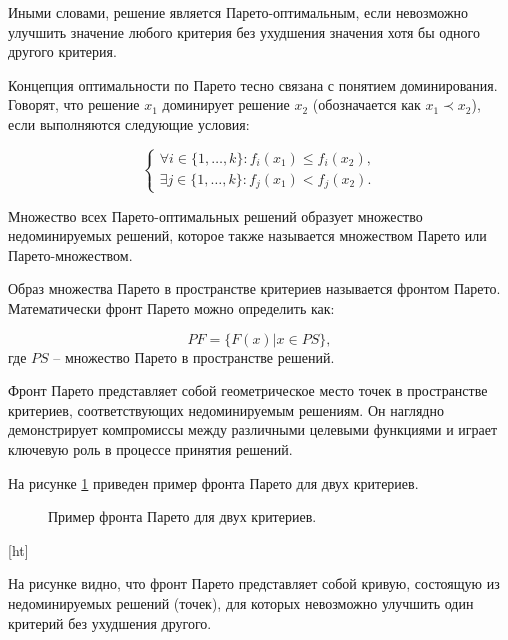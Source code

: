 Иными словами, решение является Парето-оптимальным, если невозможно
улучшить значение любого критерия без ухудшения значения хотя бы одного другого критерия.

Концепция оптимальности по Парето тесно связана с понятием доминирования.
Говорят, что решение $x_1$ доминирует решение $x_2$ (обозначается как $x_1 \prec x_2$), если выполняются следующие условия:

\begin{equation}
    \label{eq:dominance}
    \begin{cases}
        \forall i \in \{1, \ldots, k\}: f_i(x_1) \leq f_i(x_2), \\
        \exists j \in \{1, \ldots, k\}: f_j(x_1) < f_j(x_2).
    \end{cases}
\end{equation}

Множество всех Парето-оптимальных решений образует множество
недоминируемых решений, которое также называется множеством Парето или Парето-множеством.

Образ множества Парето в пространстве критериев называется фронтом Парето. Математически фронт Парето можно определить как:

\begin{equation}
    PF = \{F(x) | x \in PS\},
\end{equation}
где $PS$ -- множество Парето в пространстве решений.

Фронт Парето представляет собой геометрическое место точек \cite*{coello2007evolutionary} в
пространстве критериев, соответствующих недоминируемым решениям.
Он наглядно демонстрирует компромиссы между различными целевыми
функциями и играет ключевую роль в процессе принятия решений.

На рисунке \ref{fig:pareto_front_example} приведен пример фронта Парето для двух критериев.

\begin{figure}[ht]
    \caption{Пример фронта Парето для двух критериев.}\label{fig:pareto_front_example}
\end{figure}[ht]

На рисунке видно, что фронт Парето представляет собой кривую, состоящую из
недоминируемых решений
(точек), для которых невозможно улучшить один критерий без ухудшения другого.

